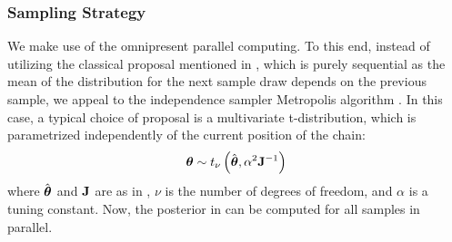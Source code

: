 \subsubsection{Sampling Strategy} 
We make use of the omnipresent parallel computing. To this end, instead of utilizing the classical proposal mentioned in , which is purely sequential as the mean of the distribution for the next sample draw depends on the previous sample, we appeal to the independence sampler Metropolis algorithm \cite{gelman2004}. In this case, a typical choice of proposal is a multivariate t-distribution, which is parametrized independently of the current position of the chain:
\[
  {\boldsymbol\theta} \sim t_{\nu}\left( \hat{{\boldsymbol\theta}}, \alpha^2 \mathbf{J}^{-1} \right)
\]
where $\hat{{\boldsymbol\theta}}$ and $\mathbf{J}$ are as in , $\nu$ is the number of degrees of freedom, and $\alpha$ is a tuning constant. Now, the posterior in  can be computed for all samples in parallel.
